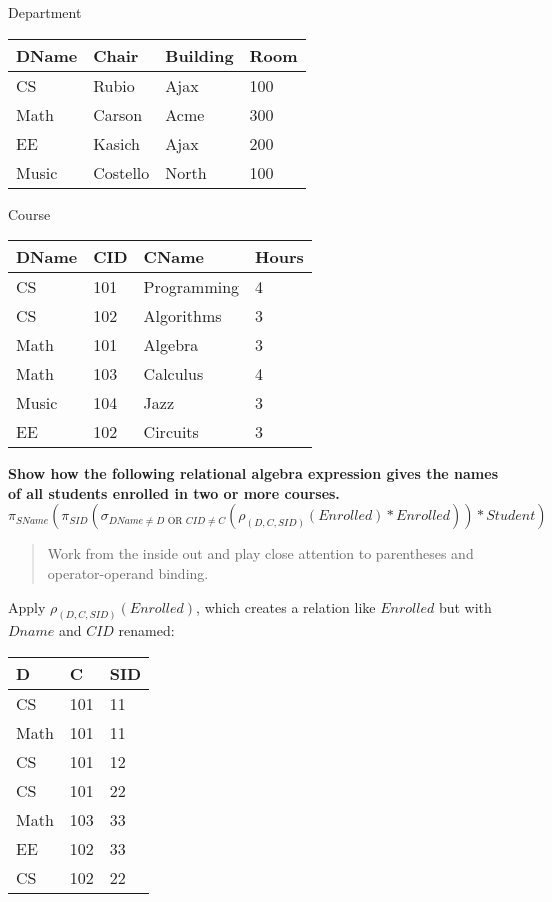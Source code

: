 \documentclass[10pt]{article}
\begin{document}
\vspace{.2in}

\begin{multicols}{2}
Department\\
\begin{tabular}{|l|l|l|l|}\hline
\rowcolor{lightgray} DName & Chair & Building & Room \\\hline
CS & Rubio & Ajax & 100 \\\hline
Math & Carson & Acme & 300 \\\hline
EE & Kasich & Ajax & 200 \\\hline
Music & Costello & North & 100  \\\hline
\end{tabular}

\columnbreak

Course\\
\begin{tabular}{|l|l|l|l|}\hline
\rowcolor{lightgray} DName & CID & CName & Hours \\\hline
CS & 101 & Programming & 4 \\\hline
CS & 102 & Algorithms & 3 \\\hline
Math & 101 & Algebra & 3 \\\hline
Math & 103 & Calculus & 4 \\\hline
Music & 104 & Jazz & 3 \\\hline
EE & 102 & Circuits & 3 \\\hline
\end{tabular}

\end{multicols}

\newpage

{\bf Show how the following relational algebra expression gives the names of all students enrolled in two or more courses.}
\[
\pi_{SName}(\pi_{SID} (\sigma_{DName \ne D \text{ OR } CID \ne C} (\rho_{(D, C, SID)}(Enrolled) * Enrolled)) * Student)
\]

\begin{quote}
  Work from the inside out and play close attention to parentheses and operator-operand binding.
\end{quote}

Apply $\rho_{(D, C, SID)}(Enrolled)$, which creates a relation like $Enrolled$ but with $Dname$ and $CID$ renamed:\\

\begin{tabular}{|l|l|l|}\hline
\rowcolor{lightgray} D & C & SID \\\hline
CS & 101 & 11 \\\hline
Math & 101 & 11 \\\hline
CS & 101 & 12 \\\hline
CS & 101 & 22 \\\hline
Math & 103 & 33 \\\hline
EE & 102 & 33 \\\hline
CS & 102 & 22 \\\hline
\end{tabular}\\
\end{document}
